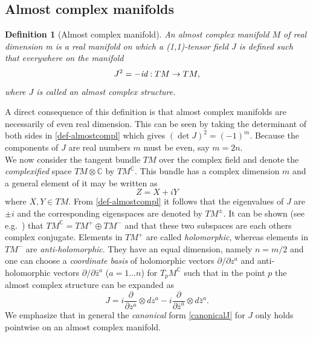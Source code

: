 \documentclass[12pt,twoside]{book}
\newtheorem{definition}{Definition}[chapter]
\begin{document}
\subsection{Almost complex manifolds}

\begin{definition}[Almost complex manifold]
An almost complex manifold $M$ of real dimension m is a real manifold on which a (1,1)-tensor field $J$ is defined such that everywhere on the manifold
\begin{equation}\label{def-almostcompl}
J^{2}=-\emph{id} : TM \rightarrow TM,
\end{equation}where $J$ is called an almost complex structure.
\end{definition}

A direct consequence of this definition is that almost complex manifolds are necessarily of even real dimension. This can be seen by taking the determinant of both sides in \eqref{def-almostcompl} which gives $(\det J)^{2} = (-1)^{m}$. Because the components of $J$ are real numbers $m$ must be even, say $m=2n$.\\

We now consider the tangent bundle $TM$ over the complex field and denote the \emph{complexified} space $TM\otimes\mathbb{C}$ by $TM^{\mathbb{C}}$. This bundle has a complex dimension $m$ and a general element of it may be written as
\begin{equation}
Z=X+iY
\end{equation}where $X,Y\in TM$. From \eqref{def-almostcompl} it follows that the eigenvalues of $J$ are $\pm i$ and the corresponding eigenspaces are denoted by $TM^{\pm}$. It can be shown (see e.g.\ \cite{diffgeo-ccl}) that $TM^{\mathbb{C}} = TM^{+} \oplus TM^{-}$ and that these two subspaces are each others complex conjugate. Elements in $TM^{+}$ are called \emph{holomorphic}, whereas elements in $TM^{-}$ are \emph{anti-holomorphic}.
They have an equal dimension, namely $n=m/2$ and one can choose a \emph{coordinate basis} of holomorphic vectors $\partial/\partial z^{a}$ and anti-holomorphic vectors $\partial/\partial \bar{z}^{a}$ ($a=1\ldots n$) for $T_{p}M^{\mathbb{C}}$ such that in the point $p$ the almost complex structure can be expanded as
\begin{equation}\label{canonicalJ}
J=i\frac{\partial}{\partial z^{a}}\otimes dz^{a} -i\frac{\partial}{\partial \bar{z}^{a}}\otimes d\bar{z}^{a}.
\end{equation}We emphasize that in general the \emph{canonical} form \eqref{canonicalJ} for $J$ only holds pointwise on an almost complex manifold.
\end{document}
